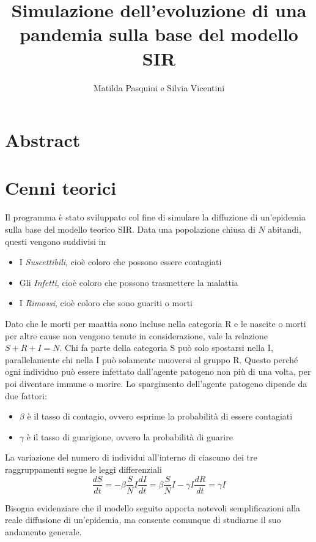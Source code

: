 \documentclass[11pt, a4paper]{article} %
\title{Simulazione dell'evoluzione di una pandemia sulla base del modello SIR}
\author{Matilda Pasquini e Silvia Vicentini}
\begin{document}
\maketitle
\section{Abstract}

\section{Cenni teorici}
Il programma \`{e} stato sviluppato col fine di simulare la diffuzione di un'epidemia sulla base del modello teorico SIR. Data una popolazione chiusa di $N$ abitandi, questi vengono suddivisi in
\begin{itemize}
\item I \textit{Suscettibili}, cio\`{e} coloro che possono essere contagiati
\item Gli \textit{Infetti}, cio\`{e} coloro che possono trasmettere la malattia
\item I \textit{Rimossi}, cio\`{e} coloro che sono guariti o morti
\end{itemize}
Dato che le morti per maattia sono incluse nella categoria R e le nascite o morti per altre cause non vengono tenute in considerazione, vale la relazione $S+R+I=N$. Chi fa parte della categoria S pu\`{o} solo spostarsi nella I, parallelamente chi nella I pu\`{o} solamente muoversi al gruppo R. Questo perch\'e ogni individuo pu\`{o} essere infettato dall'agente patogeno non pi\`{u} di una volta, per poi diventare immune o morire. 
Lo spargimento dell'agente patogeno dipende da due fattori:
\begin{itemize}
\item \textit{$\beta$} \`{e} il tasso di contagio, ovvero esprime la probabilit\`{a} di essere contagiati

\item \textit{$\gamma$} \`{e} il tasso di guarigione, ovvero la probabilit\`{a} di guarire
\end{itemize}
La variazione del numero di individui all'interno di ciascuno dei tre raggruppamenti segue le leggi differenziali
\begin{equation}
\frac{dS}{dt} = -\beta \frac{S}{N}I 
\frac{dI}{dt} = \beta \frac{S}{N}I-\gamma I
\frac{dR}{dt} = \gamma I
\end{equation}

Bisogna evidenziare che il modello seguito apporta notevoli semplificazioni alla reale diffusione di un'epidemia, ma consente comunque di studiarne il suo andamento generale.
\end{document}
